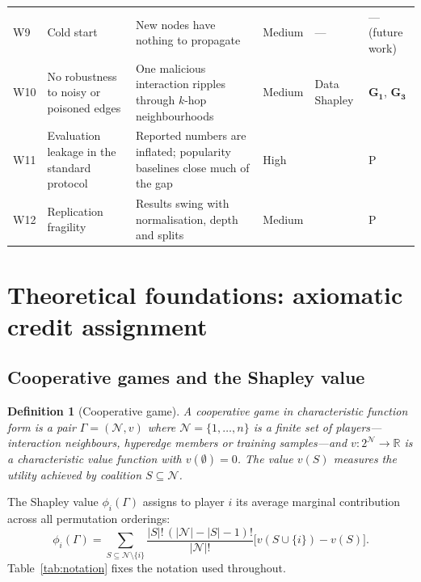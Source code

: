 \documentclass[final,5p,times,twocolumn]{elsarticle}
\newtheorem{definition}{Definition}
\begin{document}
\begin{table}[t]
\begin{tabular}{llp{6.5cm}lp{3.0cm}l}
W9 & Cold start & New nodes have nothing to propagate & Medium & ---
& --- (future work) \\
W10 & No robustness to noisy or poisoned edges & One malicious interaction
ripples through $k$-hop neighbourhoods & Medium & Data Shapley
\citep{ghorbani2019datashapley} & $\mathbf{G_1}$, $\mathbf{G_3}$ \\
W11 & Evaluation leakage in the standard protocol & Reported numbers are
inflated; popularity baselines close much of the gap & High &
\citep{dacrema2019worrying} & P \\
W12 & Replication fragility & Results swing with normalisation, depth and
splits & Medium & \citep{peska2023lightgcn} & P \\
\bottomrule
\end{tabular}
\end{table}

\section{Theoretical foundations: axiomatic credit assignment}
\label{sec:theory}

\subsection{Cooperative games and the Shapley value}
\label{sec:coopgame}

\begin{definition}[Cooperative game]
\label{def:game}
A cooperative game in characteristic function form is a pair $\Gamma =
(\mathcal{N}, v)$ where $\mathcal{N} = \{1,\dots,n\}$ is a finite set of
players---interaction neighbours, hyperedge members or training samples---and
$v : 2^{\mathcal{N}} \to \mathbb{R}$ is a characteristic value function with
$v(\emptyset) = 0$. The value $v(S)$ measures the utility achieved by coalition
$S \subseteq \mathcal{N}$.
\end{definition}

The Shapley value $\phi_i(\Gamma)$ assigns to player $i$ its average marginal
contribution across all permutation orderings:
\begin{equation}
\phi_i(\Gamma) = \!\!\sum_{S \subseteq \mathcal{N} \setminus \{i\}}\!\!
\frac{|S|!\,(|\mathcal{N}| - |S| - 1)!}{|\mathcal{N}|!}
\bigl[ v(S \cup \{i\}) - v(S) \bigr].
\label{eq:shapley}
\end{equation}
Table~\ref{tab:notation} fixes the notation used throughout.
\end{document}
